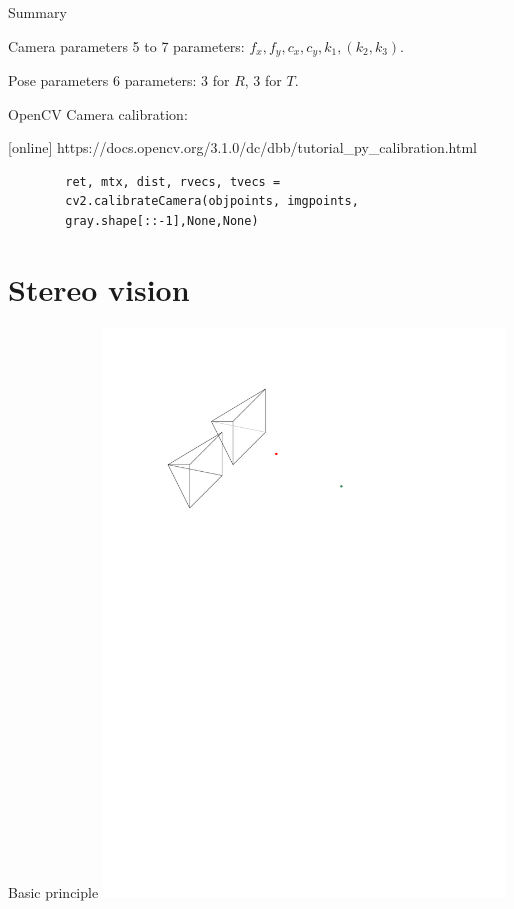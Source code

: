 \documentclass[aspectratio=169]{beamer}
\begin{document}
\begin{frame}{Summary}
    \begin{block}{Camera parameters}
        5 to 7 parameters: $f_x, f_y, c_x, c_y, k_1, (k_2, k_3)$.
    \end{block}
    \begin{block}{Pose parameters}
        6 parameters: 3 for $R$, 3 for $T$.
    \end{block}
\end{frame}
\begin{frame}[fragile]{OpenCV}
    Camera calibration:
    \begin{thebibliography}{9}
        [online]
        \small https://docs.opencv.org/3.1.0/dc/dbb/tutorial\_py\_calibration.html
    \end{thebibliography}
    \begin{verbatim}
        ret, mtx, dist, rvecs, tvecs =
        cv2.calibrateCamera(objpoints, imgpoints,
        gray.shape[::-1],None,None)
    \end{verbatim}
\end{frame}
\section{Stereo vision}
\begin{frame}
    \tableofcontents[sectionstyle=show/shaded]
\end{frame}
\begin{frame}{Basic principle}
    \includegraphics[width=0.8\textwidth]{images/stereo.pdf}
\end{frame}
\end{document}
